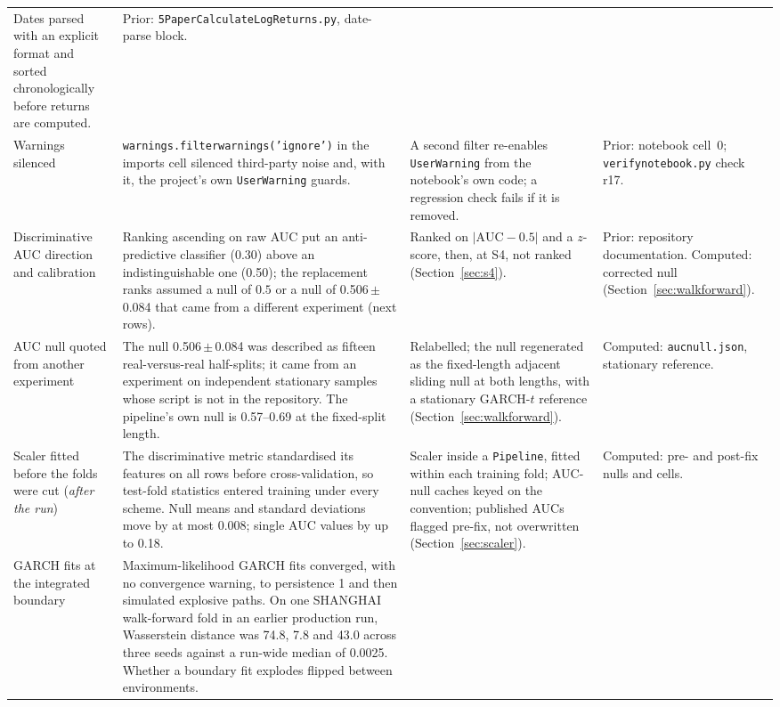 \documentclass[11pt,a4paper]{article}
\makeatletter
\DeclareRobustCommand{\_}{\ifmmode\nfss@text{\textunderscore}\else\textunderscore\allowbreak\fi}
\makeatother
\begin{document}
{\begin{xltabular}{\linewidth}{@{}>{\raggedright\arraybackslash}p{3.0cm} >{\raggedright\arraybackslash}X >{\raggedright\arraybackslash}p{3.3cm} >{\raggedright\arraybackslash}p{2.6cm}@{}}
Dates parsed with an explicit format and sorted chronologically before returns are computed. &
Prior: \texttt{5\_Paper\_Calculate\_LogReturns.py}, date-parse block. \\
\addlinespace
Warnings silenced &
\texttt{warnings.\allowbreak filterwarnings('ignore')} in the imports cell silenced third-party noise and, with it, the project's own \texttt{UserWarning} guards. &
A second filter re-enables \texttt{UserWarning} from the notebook's own code; a regression check fails if it is removed. &
Prior: notebook cell~0; \texttt{verify\_notebook.py} check r17. \\
\addlinespace
Discriminative AUC direction and calibration &
Ranking ascending on raw AUC put an anti-predictive classifier (0.30) above an indistinguishable one (0.50); the replacement ranks assumed a null of $0.5$ or a null of 0.506\,$\pm$\,0.084 that came from a different experiment (next rows). &
Ranked on $|\mathrm{AUC}-0.5|$ and a $z$-score, then, at S4, not ranked (Section~\ref{sec:s4}). &
Prior: repository documentation. Computed: corrected null (Section~\ref{sec:walkforward}). \\
\addlinespace
AUC null quoted from another experiment &
The null 0.506\,$\pm$\,0.084 was described as fifteen real-versus-real half-splits; it came from an experiment on independent stationary samples whose script is not in the repository. The pipeline's own null is 0.57--0.69 at the fixed-split length. &
Relabelled; the null regenerated as the fixed-length adjacent sliding null at both lengths, with a stationary GARCH-$t$ reference (Section~\ref{sec:walkforward}). &
Computed: \texttt{auc\_null.json}, stationary reference. \\
\addlinespace
Scaler fitted before the folds were cut (\emph{after the run}) &
The discriminative metric standardised its features on all rows before cross-validation, so test-fold statistics entered training under every scheme. Null means and standard deviations move by at most 0.008; single AUC values by up to 0.18. &
Scaler inside a \texttt{Pipeline}, fitted within each training fold; AUC-null caches keyed on the convention; published AUCs flagged pre-fix, not overwritten (Section~\ref{sec:scaler}). &
Computed: pre- and post-fix nulls and cells. \\
\addlinespace
GARCH fits at the integrated boundary &
Maximum-likelihood GARCH fits converged, with no convergence warning, to persistence 1 and then simulated explosive paths. On one SHANGHAI walk-forward fold in an earlier production run, Wasserstein distance was 74.8, 7.8 and 43.0 across three seeds against a run-wide median of 0.0025. Whether a boundary fit explodes flipped between environments. &

\end{xltabular}}
\end{document}
